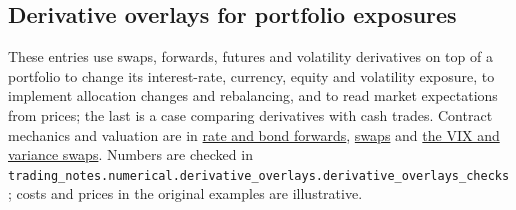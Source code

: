 \subsection{Derivative overlays for portfolio exposures}

These entries use swaps, forwards, futures and volatility derivatives on top of a portfolio to change its interest-rate, currency, equity and volatility exposure, to implement allocation changes and rebalancing, and to read market expectations from prices; the last is a case comparing derivatives with cash trades. Contract mechanics and valuation are in \hyperref[meth:rate-bond-forward-valuation]{rate and bond forwards}, \hyperref[meth:swap-valuation-replication]{swaps} and \hyperref[def:vix-variance-dividend-swaps]{the VIX and variance swaps}. Numbers are checked in \nolinkurl{trading_notes.numerical.derivative_overlays.derivative_overlays_checks}; costs and prices in the original examples are illustrative.

